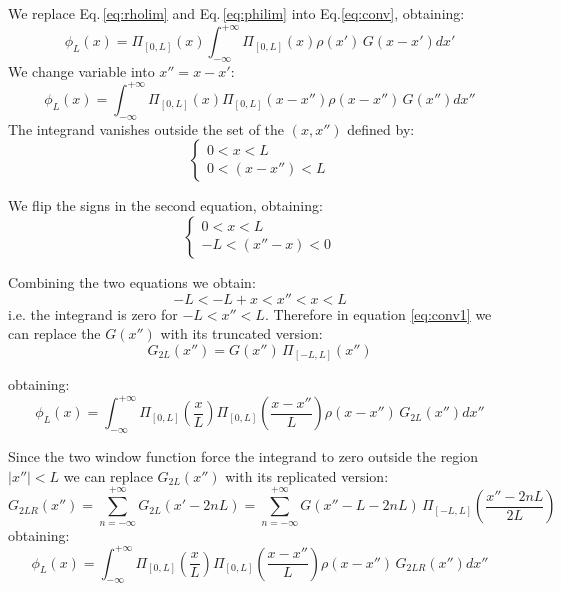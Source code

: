 \documentclass[a4paper,12pt]{report}
\begin{document}
We replace Eq.\,\eqref{eq:rholim} and Eq.\,\eqref{eq:philim} into Eq.\eqref{eq:conv}, obtaining:
\begin{equation}
\phi_L(x) = \Pi_{[0,L]}\left( x\right)
\int_{-\infty}^{+\infty} 
\Pi_{[0,L]}\left(x\right)
\rho(x')\,G(x-x') dx'
\end{equation}
We change variable into $x'' = x - x'$:
\begin{equation}
\phi_L(x) = 
\int_{-\infty}^{+\infty} 
\Pi_{[0,L]}\left({x}\right)
\Pi_{[0,L]}\left({x-x''}\right)
\rho(x-x'')\,G(x'') dx''
\label{eq:conv1}
\end{equation}
The integrand vanishes outside the set of the $(x, x'')$ defined by:
\begin{equation}
\begin{cases}
0 < x <{L}\\
0 < (x-x'') <{L}
\end{cases}
\end{equation}

We flip the signs in the second equation, obtaining:
\begin{equation}
\begin{cases}
0 < x <{L}\\
-L < (x''-x) <0
\end{cases}
\end{equation}

Combining the two equations we obtain:
\begin{equation}
-L<-L + x < x'' <x<L
\end{equation}
i.e. the integrand is zero for $-L<x''<L$.
Therefore in equation \eqref{eq:conv1} we can replace the $G(x'')$ with its truncated version:
\begin{equation}
G_{2L}(x'') = G(x'')\,\Pi_{[-L,L]}
\left(
{x''}
\right)
\end{equation}

obtaining:
\begin{equation}
\phi_L(x) = 
\int_{-\infty}^{+\infty} 
\Pi_{[0,L]}\left(\frac{x}{L}\right)
\Pi_{[0,L]}\left(\frac{x-x''}{L}\right)
\rho(x-x'')\,G_{2L}(x'') dx''
\label{eq:conv2}
\end{equation}

Since the two window function force the integrand to zero outside the region $|x''|<L$ we can replace $G_{2L}(x'')$ with its replicated version:
\begin{equation}
G_{2LR}(x'') = \sum_{n=-\infty}^{+\infty}G_{2L}(x'-2nL) = \sum_{n=-\infty}^{+\infty}G(x''- L -2nL)\,\Pi_{[-L,L]}
\left(
\frac{x''-2nL}{2L}
\right)
\label{eq:GRL}
\end{equation}
obtaining:
\begin{equation}
\phi_L(x) = 
\int_{-\infty}^{+\infty} 
\Pi_{[0,L]}\left(\frac{x}{L}\right)
\Pi_{[0,L]}\left(\frac{x-x''}{L}\right)
\rho(x-x'')\,G_{2LR}(x'') dx''
\end{equation}
\end{document}
